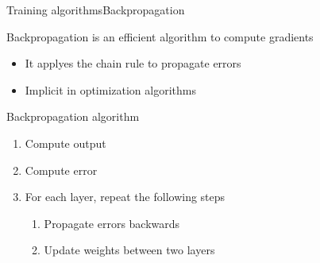 \documentclass[10pt,compress]{beamer} %
\begin{document}
\begin{frame}{Training algorithms}{Backpropagation}

        Backpropagation is an efficient algorithm to compute gradients
        \begin{itemize}
                \item It applyes the chain rule to propagate errors
		\item Implicit in optimization algorithms
        \end{itemize}

	\begin{block}{Backpropagation algorithm}
	\begin{enumerate}
	\item Compute output
	\item Compute error
	\item For each layer, repeat the following steps
	\begin{enumerate}
		\item Propagate errors backwards
		\item Update weights between two layers
	\end{enumerate}
	\end{enumerate}
	\end{block}
\end{frame}

\end{document}
